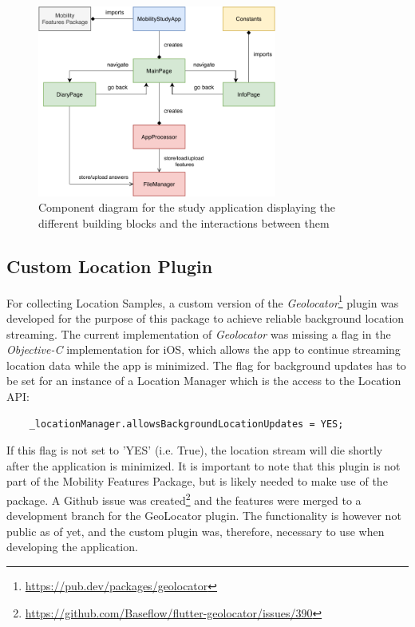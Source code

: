 \begin{figure}
    \centering
    \includegraphics[width=0.7\textwidth]{images/diagrams/app-diagram.pdf}
    \caption{Component diagram for the study application displaying the different building blocks and the interactions between them}
    \label{fig:app-component-diagram}
\end{figure}

\subsection{Custom Location Plugin}
For collecting Location Samples, a custom version of the \textit{Geolocator}\footnote{\url{https://pub.dev/packages/geolocator}} plugin was developed for the purpose of this package to achieve reliable background location streaming. The current implementation of \textit{Geolocator} was missing a flag in the \textit{Objective-C} implementation for iOS, which allows the app to continue streaming location data while the app is minimized. The flag for background updates has to be set for an instance of a Location Manager which is the access to the Location API:

\begin{verbatim}
    _locationManager.allowsBackgroundLocationUpdates = YES;
\end{verbatim}

If this flag is not set to 'YES' (i.e. True), the location stream will die shortly after the application is minimized. It is important to note that this plugin is not part of the Mobility Features Package, but is likely needed to make use of the package. A Github issue was created\footnote{\url{https://github.com/Baseflow/flutter-geolocator/issues/390}} and the features were merged to a development branch for the GeoLocator plugin. The functionality is however not public as of yet, and the custom plugin was, therefore, necessary to use when developing the application. 

